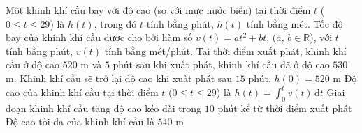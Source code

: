 \begin{ex}%
	Một khinh khí cầu bay với độ cao (so với mực nước biển) tại thời điểm $t$ ($0\leq t\leq 29$) là $h(t)$, trong  đó $t$ tính bằng phút, $h(t)$ tính bằng mét. Tốc độ bay của khinh khí cầu được cho bởi hàm số $v(t)=at^{2}+bt$, ($a$, $b\in\mathbb{R}$), với $t$ tính bằng phút, $v(t)$ tính bằng mét/phút. Tại thời điểm xuất phát, khinh khí cầu ở độ cao $520$ m và $5$ phút sau khi xuất phát, khinh khí cầu đã ở độ cao $530$ m. Khinh khí cầu sẽ trở lại độ cao khi xuất phát sau $15$ phút.
	\choiceTF 
		{\True $h(0)=520$  m}
		{\True Độ cao của khinh khí cầu tại thời  điểm $t$ ($0\leq t\leq 29$) là $h(t)=\displaystyle\int_{0}^{t} v(t)\,\mathrm{d}t$}
		{Giai đoạn khinh khí cầu tăng độ cao kéo  dài trong $10$ phút kể từ thời điểm xuất phát}
		{Độ cao tối đa  của khinh khí cầu là $540$ m}
\end{ex}
